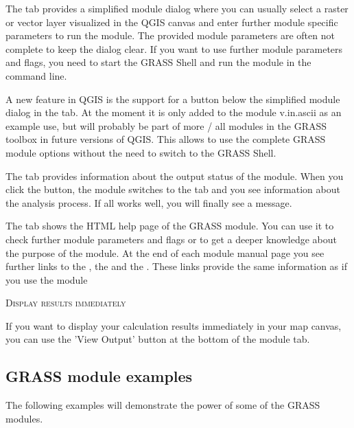 The  tab provides a simplified module dialog where you can
usually select a raster or vector layer visualized in the QGIS canvas and
enter further module specific parameters to run the module. The provided
module parameters are often not complete to keep the dialog clear. If you want
to use further module parameters and flags, you need to start the GRASS Shell
and run the module in the command line.

A new feature in QGIS \CURRENT is the support for a
 button below the simplified module dialog
in the  tab. At the moment it is only added to the module v.in.ascii
as an example use, but will probably be part of more / all modules in the
GRASS toolbox in future versions of QGIS. This allows to use the complete GRASS
module options without the need to switch to the GRASS Shell.


The  tab provides information about the output status of the
module. When you click the  button, the module switches to the
 tab and you see information about the analysis process. If all
works well, you will finally see a  message.


The  tab shows the HTML help page of the GRASS module. You can
use it to check further module parameters and flags or to get a deeper
knowledge about the purpose of the module. At the end of each module
manual page you see further links to the , the
 and the . These links provide
the same information as if you use the module 

\begin{Tip}\caption{\textsc{Display results immediately}}
If you want to display your calculation results immediately in your
map canvas, you can use the 'View Output' button at the bottom of the
module tab.
\end{Tip}

\subsection{GRASS module examples}
The following examples will demonstrate the power of some of the GRASS modules.



